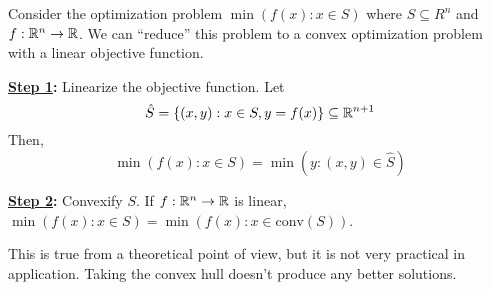 \documentclass[11pt]{article}
\newcommand{\conv}[1]{\text{conv}(#1)}
\begin{document}
Consider the optimization problem $\min(f(x):x\in S)$ where $S\subseteq R^n$ and
$f:\mathbb{R}^n\to\mathbb{R}$. We can ``reduce'' this problem to  a convex optimization problem
with a linear objective function.

{\bf \underline{Step 1}:} Linearize the objective function. Let
\begin{equation*}
	\hat{S} = \{(x,y) : x \in S, y = f(x)\} \subseteq \mathbb{R}^{n+1}
\end{equation*}
Then,
\begin{equation*}
	\min(f(x):x\in S) = \min(y:(x,y) \in \hat{S})
\end{equation*}

{\bf \underline{Step 2}:} Convexify $S$.
If $f:\mathbb{R}^n\to\mathbb{R}$ is linear, $\min(f(x):x\in S) = \min(f(x):x\in \conv{S})$.

\begin{remark}
	This is true from a theoretical point of view, but it is not very practical
	in application. Taking the convex hull doesn't produce any better solutions.
\end{remark}
\end{document}
